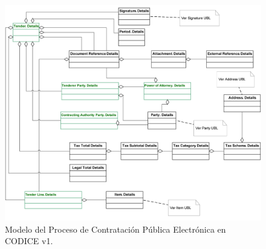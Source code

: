 %
\begin{figure}[!htb]
\centering
	\includegraphics[width=16cm]{images/phd/eproc/codice-3-tender}
\caption{Modelo del Proceso de Contratación Pública Electrónica en CODICE v1.}
\label{fig:codice-3}
\end{figure}


